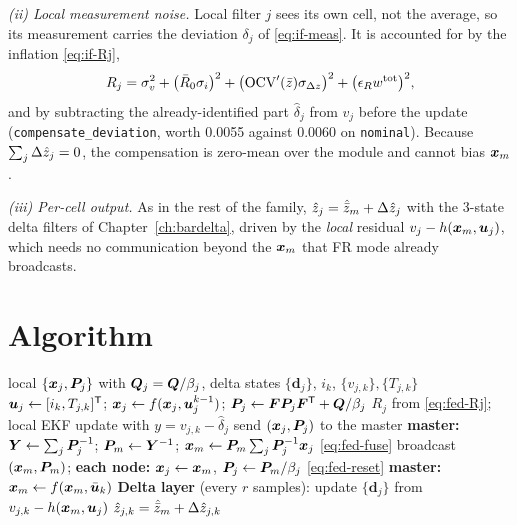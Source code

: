 \emph{(ii) Local measurement noise.} Local filter $j$ sees its own cell, not the average, so its
measurement carries the deviation $\delta_j$ of \eqref{eq:if-meas}. It is accounted for by the
inflation \eqref{eq:if-Rj},
\begin{equation}
R_j = \sigma_v^2 + \big(\bar R_0\sigma_i\big)^2 + \big(\mathrm{OCV}'(\bar{z})\sigma_{\Delta z}\big)^2 + \big(\epsilon_R w^{\mathrm{tot}}\big)^2 ,
\label{eq:fed-Rj}
\end{equation}
and by subtracting the already-identified part $\hat\delta_j$ from $v_j$ before the update
(\texttt{compensate\_deviation}, worth \num{0.0055} against \num{0.0060} on \texttt{nominal}).
Because $\sum_j\Delta\hat{z}_j=0$, the compensation is zero-mean over the module and cannot bias
$\bm{x}_m$.

\emph{(iii) Per-cell output.} As in the rest of the family, $\hat{z}_j = \hat{\bar{z}}_m +
\Delta\hat{z}_j$ with the 3-state delta filters of Chapter~\ref{ch:bardelta}, driven by the
\emph{local} residual $v_j - h(\bm{x}_m,\bm{u}_j)$, which needs no communication beyond the $\bm{x}_m$
that FR mode already broadcasts.

\section{Algorithm}
\begin{algorithm}[H]
\caption{Federated (FR mode) --- one sampling period $k$}
\begin{algorithmic}[1]
\Require local $\{\bm{x}_j,\bm{P}_j\}$ with $\bm{Q}_j = \bm{Q}/\beta_j$, delta states $\{\bm{d}_j\}$, $i_k$, $\{v_{j,k}\},\{T_{j,k}\}$
  \State $\bm{u}_j\gets[i_k,T_{j,k}]^{\mathsf{T}}$;\;
         $\bm{x}_j\gets f(\bm{x}_j,\bm{u}_j^{k-1})$;\; $\bm{P}_j\gets\bm{F}\bm{P}_j\bm{F}^{\mathsf{T}}+\bm{Q}/\beta_j$
  \State $R_j$ from \eqref{eq:fed-Rj};\;
         local EKF update with $y = v_{j,k}-\hat\delta_j$
  \State send $(\bm{x}_j,\bm{P}_j)$ to the master 
\EndFor
{}
  \State \textbf{master:} $\bm{Y}\gets\sum_j\bm{P}_j^{-1}$;\;
         $\bm{P}_m\gets\bm{Y}^{-1}$;\; $\bm{x}_m\gets\bm{P}_m\sum_j\bm{P}_j^{-1}\bm{x}_j$ \hfill \eqref{eq:fed-fuse}
  \State broadcast $(\bm{x}_m,\bm{P}_m)$;\quad
         \textbf{each node:} $\bm{x}_j\gets\bm{x}_m$, $\bm{P}_j\gets\bm{P}_m/\beta_j$ \hfill \eqref{eq:fed-reset}
\Else
  \State \textbf{master:} $\bm{x}_m\gets f(\bm{x}_m,\bar{\bm{u}}_k)$ 
\EndIf
\State \textbf{Delta layer} (every $r$ samples): update $\{\bm{d}_j\}$ from $v_{j,k}-h(\bm{x}_m,\bm{u}_j)$
\Ensure $\hat{z}_{j,k}=\hat{\bar{z}}_m + \Delta\hat{z}_{j,k}$
\end{algorithmic}
\end{algorithm}

